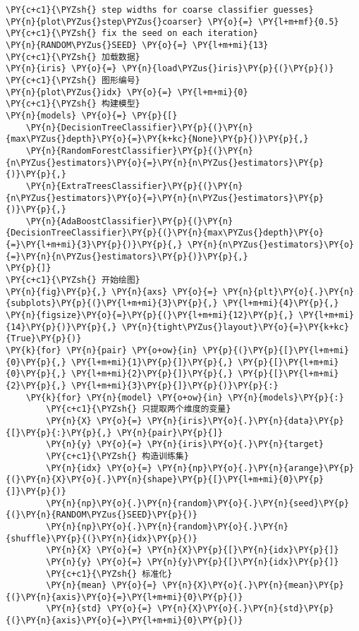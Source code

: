 \begin{Verbatim}[commandchars=\\\{\}]
\PY{c+c1}{\PYZsh{} step widths for coarse classifier guesses}
\PY{n}{plot\PYZus{}step\PYZus{}coarser} \PY{o}{=} \PY{l+m+mf}{0.5}
\PY{c+c1}{\PYZsh{} fix the seed on each iteration}
\PY{n}{RANDOM\PYZus{}SEED} \PY{o}{=} \PY{l+m+mi}{13}
\PY{c+c1}{\PYZsh{} 加载数据}
\PY{n}{iris} \PY{o}{=} \PY{n}{load\PYZus{}iris}\PY{p}{(}\PY{p}{)}
\PY{c+c1}{\PYZsh{} 图形编号}
\PY{n}{plot\PYZus{}idx} \PY{o}{=} \PY{l+m+mi}{0}
\PY{c+c1}{\PYZsh{} 构建模型}
\PY{n}{models} \PY{o}{=} \PY{p}{[}
    \PY{n}{DecisionTreeClassifier}\PY{p}{(}\PY{n}{max\PYZus{}depth}\PY{o}{=}\PY{k+kc}{None}\PY{p}{)}\PY{p}{,}
    \PY{n}{RandomForestClassifier}\PY{p}{(}\PY{n}{n\PYZus{}estimators}\PY{o}{=}\PY{n}{n\PYZus{}estimators}\PY{p}{)}\PY{p}{,}
    \PY{n}{ExtraTreesClassifier}\PY{p}{(}\PY{n}{n\PYZus{}estimators}\PY{o}{=}\PY{n}{n\PYZus{}estimators}\PY{p}{)}\PY{p}{,}
    \PY{n}{AdaBoostClassifier}\PY{p}{(}\PY{n}{DecisionTreeClassifier}\PY{p}{(}\PY{n}{max\PYZus{}depth}\PY{o}{=}\PY{l+m+mi}{3}\PY{p}{)}\PY{p}{,} \PY{n}{n\PYZus{}estimators}\PY{o}{=}\PY{n}{n\PYZus{}estimators}\PY{p}{)}\PY{p}{,}
\PY{p}{]}
\PY{c+c1}{\PYZsh{} 开始绘图}
\PY{n}{fig}\PY{p}{,} \PY{n}{axs} \PY{o}{=} \PY{n}{plt}\PY{o}{.}\PY{n}{subplots}\PY{p}{(}\PY{l+m+mi}{3}\PY{p}{,} \PY{l+m+mi}{4}\PY{p}{,} \PY{n}{figsize}\PY{o}{=}\PY{p}{(}\PY{l+m+mi}{12}\PY{p}{,} \PY{l+m+mi}{14}\PY{p}{)}\PY{p}{,} \PY{n}{tight\PYZus{}layout}\PY{o}{=}\PY{k+kc}{True}\PY{p}{)}
\PY{k}{for} \PY{n}{pair} \PY{o+ow}{in} \PY{p}{(}\PY{p}{[}\PY{l+m+mi}{0}\PY{p}{,} \PY{l+m+mi}{1}\PY{p}{]}\PY{p}{,} \PY{p}{[}\PY{l+m+mi}{0}\PY{p}{,} \PY{l+m+mi}{2}\PY{p}{]}\PY{p}{,} \PY{p}{[}\PY{l+m+mi}{2}\PY{p}{,} \PY{l+m+mi}{3}\PY{p}{]}\PY{p}{)}\PY{p}{:}
    \PY{k}{for} \PY{n}{model} \PY{o+ow}{in} \PY{n}{models}\PY{p}{:}
        \PY{c+c1}{\PYZsh{} 只提取两个维度的变量}
        \PY{n}{X} \PY{o}{=} \PY{n}{iris}\PY{o}{.}\PY{n}{data}\PY{p}{[}\PY{p}{:}\PY{p}{,} \PY{n}{pair}\PY{p}{]}
        \PY{n}{y} \PY{o}{=} \PY{n}{iris}\PY{o}{.}\PY{n}{target}
        \PY{c+c1}{\PYZsh{} 构造训练集}
        \PY{n}{idx} \PY{o}{=} \PY{n}{np}\PY{o}{.}\PY{n}{arange}\PY{p}{(}\PY{n}{X}\PY{o}{.}\PY{n}{shape}\PY{p}{[}\PY{l+m+mi}{0}\PY{p}{]}\PY{p}{)}
        \PY{n}{np}\PY{o}{.}\PY{n}{random}\PY{o}{.}\PY{n}{seed}\PY{p}{(}\PY{n}{RANDOM\PYZus{}SEED}\PY{p}{)}
        \PY{n}{np}\PY{o}{.}\PY{n}{random}\PY{o}{.}\PY{n}{shuffle}\PY{p}{(}\PY{n}{idx}\PY{p}{)}
        \PY{n}{X} \PY{o}{=} \PY{n}{X}\PY{p}{[}\PY{n}{idx}\PY{p}{]}
        \PY{n}{y} \PY{o}{=} \PY{n}{y}\PY{p}{[}\PY{n}{idx}\PY{p}{]}
        \PY{c+c1}{\PYZsh{} 标准化}
        \PY{n}{mean} \PY{o}{=} \PY{n}{X}\PY{o}{.}\PY{n}{mean}\PY{p}{(}\PY{n}{axis}\PY{o}{=}\PY{l+m+mi}{0}\PY{p}{)}
        \PY{n}{std} \PY{o}{=} \PY{n}{X}\PY{o}{.}\PY{n}{std}\PY{p}{(}\PY{n}{axis}\PY{o}{=}\PY{l+m+mi}{0}\PY{p}{)}

\end{Verbatim}
